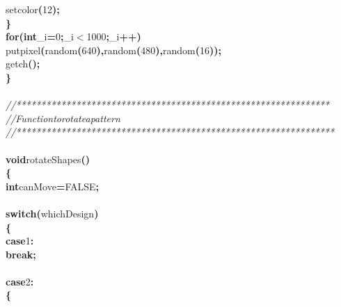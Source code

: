 \documentclass[a4paper, 10pt]{article}
\newcommand\SPC{\hspace*{0.6em}}
\newcommand{\CppAComment}[1]{\textit{\textcolor[rgb]{0.2,0.6,1}{#1}}}
\newcommand{\CppAIdentifier}[1]{#1}
\newcommand{\CppANumber}[1]{\textcolor[rgb]{0.5,0,0.5}{#1}}
\newcommand{\CppAReservedWord}[1]{\textbf{#1}}
\newcommand{\CppASpace}[1]{\colorbox[rgb]{1,1,1}{#1}}
\newcommand{\CppASymbol}[1]{\textbf{\textcolor[rgb]{1,0,0}{#1}}}
\begin{document}
\begin{ttfamily}
\CppASpace{\SPC }\CppAIdentifier{setcolor}\CppASymbol{(}\CppANumber{12}\CppASymbol{)}\CppASymbol{;}\\
\CppASpace{\SPC \SPC \SPC }\CppASymbol{\}}\\
\CppASpace{\SPC \SPC \SPC }\CppAReservedWord{for}\CppASymbol{(}\CppAReservedWord{int}\CppASpace{\SPC }\CppAIdentifier{\_i}\CppASymbol{=}\CppANumber{0}\CppASymbol{;}\CppAIdentifier{\_i}\CppASymbol{$<$}\CppANumber{1000}\CppASymbol{;}\CppAIdentifier{\_i}\CppASymbol{++}\CppASymbol{)}\\
\CppASpace{\SPC }\CppAIdentifier{putpixel}\CppASymbol{(}\CppAIdentifier{random}\CppASymbol{(}\CppANumber{640}\CppASymbol{)}\CppASymbol{,}\CppAIdentifier{random}\CppASymbol{(}\CppANumber{480}\CppASymbol{)}\CppASymbol{,}\CppAIdentifier{random}\CppASymbol{(}\CppANumber{16}\CppASymbol{)}\CppASymbol{)}\CppASymbol{;}\\
\CppASpace{\SPC \SPC \SPC }\CppAIdentifier{getch}\CppASymbol{(}\CppASymbol{)}\CppASymbol{;}\\
\CppASymbol{\}}\\
\\
\CppAComment{//***************************************************************}\\
\CppAComment{//\SPC \SPC \SPC Function\SPC to\SPC rotate\SPC a\SPC pattern}\\
\CppAComment{//****************************************************************}\\
\\
\CppAReservedWord{void}\CppASpace{\SPC }\CppAIdentifier{rotateShapes}\CppASymbol{(}\CppASymbol{)}\\
\CppASymbol{\{}\\
\CppASpace{\SPC }\CppAReservedWord{int}\CppASpace{\SPC }\CppAIdentifier{canMove}\CppASymbol{=}\CppAIdentifier{FALSE}\CppASymbol{;}\\
\\
\CppASpace{\SPC }\CppAReservedWord{switch}\CppASymbol{(}\CppAIdentifier{whichDesign}\CppASymbol{)}\\
\CppASpace{\SPC }\CppASymbol{\{}\\
\CppASpace{\SPC \SPC }\CppAReservedWord{case}\CppASpace{\SPC }\CppANumber{1}\CppASymbol{:}\\
\CppASpace{\SPC \SPC }\CppAReservedWord{break}\CppASymbol{;}\\
\\
\CppASpace{\SPC \SPC }\CppAReservedWord{case}\CppASpace{\SPC }\CppANumber{2}\CppASymbol{:}\\
\CppASpace{\SPC \SPC }\CppASymbol{\{}\\

\end{ttfamily}
\end{document}
